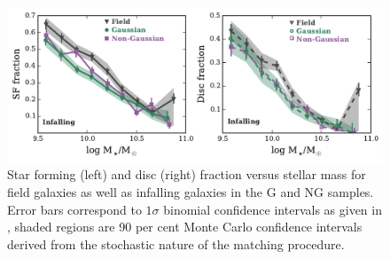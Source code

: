\documentclass[a4paper,fleqn,usenatbib]{mnras}
\begin{document}
\begin{figure}
  \centering
  \includegraphics[width=\textwidth]{disk_sfFrac95_w2_if.pdf}
  \caption{Star forming (left) and disc (right) fraction versus stellar mass for
    field galaxies as well as infalling galaxies in the G and NG
    samples.  Error bars correspond to $1 \sigma$ binomial confidence
    intervals as given in \citet{cameron2011}, shaded regions are 90
    per cent Monte Carlo confidence intervals derived from the
    stochastic nature of the matching procedure.}
  \label{fig:disk_sfFrac_if}
\end{figure}
\end{document}
